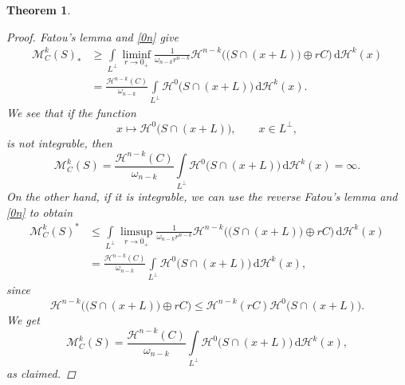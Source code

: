 \documentclass[pdflatex,sn-mathphys-num]{sn-jnl}
\theoremstyle{plain}
\newtheorem{theorem}{Theorem}[section]
\theoremstyle{definition}
\newcommand{\dH}[1]{\,\mathrm d\mathcal{H}^{#1}}
\begin{document}
\begin{theorem}
\begin{proof}
        Fatou's lemma and \eqref{0n} give \begin{equation*}
            \begin{split}
                \mathcal{M}^k_{C}(S)_*&\geq\int\limits_{L^{\perp}}\liminf_{r\to0_+}\frac{1}{\omega_{n-k}r^{n-k}}\mathcal{H}^{n-k}\Big(\big(S\cap (x+L)\big)\oplus rC\Big)\dH{k}(x)\\&=\frac{\mathcal{H}^{n-k}(C)}{\omega_{n-k}}\int\limits_{L^{\perp}}\mathcal{H}^{0}\big(S\cap (x+L)\big)\dH{k}(x).
            \end{split}
        \end{equation*} We see that if the function $$x\mapsto \mathcal{H}^{0}\big(S\cap (x+L)\big), \qquad x\in L^{\perp},$$ is not integrable, then $$\mathcal{M}^k_{C}(S)=\frac{\mathcal{H}^{n-k}(C)}{\omega_{n-k}}\int\limits_{L^{\perp}}\mathcal{H}^{0}\big(S\cap (x+L)\big)\dH{k}(x)=\infty.$$ On the other hand, if it is integrable, we can use the reverse Fatou's lemma and \eqref{0n} to obtain \begin{equation*}
            \begin{split}
                \mathcal{M}^k_{C}(S)^*&\leq\int\limits_{L^{\perp}}\limsup_{r\to0_+}\frac{1}{\omega_{n-k}r^{n-k}}\mathcal{H}^{n-k}\Big(\big(S\cap (x+L)\big)\oplus rC\Big)\dH{k}(x)\\&=\frac{\mathcal{H}^{n-k}(C)}{\omega_{n-k}}\int\limits_{L^{\perp}}\mathcal{H}^{0}\big(S\cap (x+L)\big)\dH{k}(x),
            \end{split}
        \end{equation*} since $$\mathcal{H}^{n-k}\Big(\big(S\cap (x+L)\big)\oplus rC\Big)\leq \mathcal{H}^{n-k}(rC)\mathcal{H}^0\big(S\cap (x+L)\big).$$ We get $$\mathcal{M}^k_{C}(S)=\frac{\mathcal{H}^{n-k}(C)}{\omega_{n-k}}\int\limits_{L^{\perp}}\mathcal{H}^{0}\big(S\cap (x+L)\big)\dH{k}(x),$$ as claimed.
    \end{proof}
\end{theorem}
\end{document}
